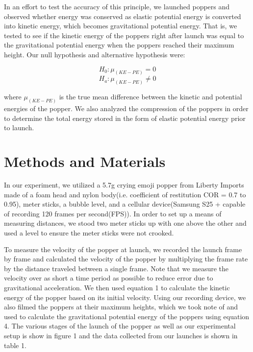\documentclass{article}
\begin{document}
In an effort to test the accuracy of this principle, we launched poppers and observed whether energy was conserved as elastic potential energy is converted into kinetic energy, which becomes gravitational potential energy. That is, we tested to see if the kinetic energy of the poppers right after launch was equal to the gravitational potential energy when the poppers reached their maximum height. Our null hypothesis and alternative hypothesis were:

\begin{equation*}
    H_0 : \mu_{\left(KE-PE\right)} = 0
\end{equation*}
\begin{equation*}
    H_a : \mu_{\left(KE-PE\right)} \neq 0
\end{equation*}

where $\mu_{\left(KE-PE\right)}$ is the true mean difference between the kinetic and potential energies of the popper. We also analyzed the compression of the poppers in order to determine the total energy stored in the form of elastic potential energy prior to launch. 

\section{Methods and Materials}

In our experiment, we utilized a 5.7g crying emoji popper from Liberty Imports made of a foam head and nylon body(i.e. coefficient of restitution COR = 0.7 to 0.95)\cite{nylon}, meter sticks, a bubble level, and a cellular device(Samsung S25 + capable of recording 120 frames per second(FPS)). In order to set up a means of measuring distances, we stood two meter sticks up with one above the other and used a level to ensure the meter sticks were not crooked. 

To measure the velocity of the popper at launch, we recorded the launch frame by frame and calculated the velocity of the popper by multiplying the frame rate by the distance traveled between a single frame. Note that we measure the velocity over as short a time period as possible to reduce error due to gravitational acceleration. We then used equation 1 to calculate the kinetic energy of the popper based on its initial velocity. Using our recording device, we also filmed the poppers at their maximum heights, which we took note of and used to calculate the gravitational potential energy of the poppers using equation 4. The various stages of the launch of the popper as well as our experimental setup is show in figure 1 and the data collected from our launches is shown in table 1.
\end{document}
